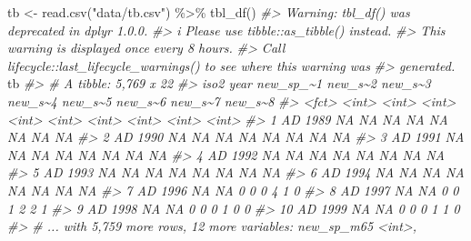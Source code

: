 \documentclass[
]{book}
\newenvironment{Shaded}{\begin{snugshade}}{\end{snugshade}}
\newcommand{\CommentTok}[1]{\textcolor[rgb]{0.56,0.35,0.01}{\textit{#1}}}
\newcommand{\FunctionTok}[1]{\textcolor[rgb]{0.00,0.00,0.00}{#1}}
\newcommand{\NormalTok}[1]{#1}
\newcommand{\OtherTok}[1]{\textcolor[rgb]{0.56,0.35,0.01}{#1}}
\newcommand{\SpecialCharTok}[1]{\textcolor[rgb]{0.00,0.00,0.00}{#1}}
\newcommand{\StringTok}[1]{\textcolor[rgb]{0.31,0.60,0.02}{#1}}
\begin{document}
\begin{Shaded}
\begin{Highlighting}[]
\NormalTok{tb }\OtherTok{\textless{}{-}} \FunctionTok{read.csv}\NormalTok{(}\StringTok{"data/tb.csv"}\NormalTok{) }\SpecialCharTok{\%\textgreater{}\%} \FunctionTok{tbl\_df}\NormalTok{()}
\CommentTok{\#\textgreater{} Warning: \textasciigrave{}tbl\_df()\textasciigrave{} was deprecated in dplyr 1.0.0.}
\CommentTok{\#\textgreater{} i Please use \textasciigrave{}tibble::as\_tibble()\textasciigrave{} instead.}
\CommentTok{\#\textgreater{} This warning is displayed once every 8 hours.}
\CommentTok{\#\textgreater{} Call \textasciigrave{}lifecycle::last\_lifecycle\_warnings()\textasciigrave{} to see where this warning was}
\CommentTok{\#\textgreater{} generated.}
\NormalTok{tb}
\CommentTok{\#\textgreater{} \# A tibble: 5,769 x 22}
\CommentTok{\#\textgreater{}    iso2   year new\_sp\_\textasciitilde{}1 new\_s\textasciitilde{}2 new\_s\textasciitilde{}3 new\_s\textasciitilde{}4 new\_s\textasciitilde{}5 new\_s\textasciitilde{}6 new\_s\textasciitilde{}7 new\_s\textasciitilde{}8}
\CommentTok{\#\textgreater{}    \textless{}fct\textgreater{} \textless{}int\textgreater{}     \textless{}int\textgreater{}   \textless{}int\textgreater{}   \textless{}int\textgreater{}   \textless{}int\textgreater{}   \textless{}int\textgreater{}   \textless{}int\textgreater{}   \textless{}int\textgreater{}   \textless{}int\textgreater{}}
\CommentTok{\#\textgreater{}  1 AD     1989        NA      NA      NA      NA      NA      NA      NA      NA}
\CommentTok{\#\textgreater{}  2 AD     1990        NA      NA      NA      NA      NA      NA      NA      NA}
\CommentTok{\#\textgreater{}  3 AD     1991        NA      NA      NA      NA      NA      NA      NA      NA}
\CommentTok{\#\textgreater{}  4 AD     1992        NA      NA      NA      NA      NA      NA      NA      NA}
\CommentTok{\#\textgreater{}  5 AD     1993        NA      NA      NA      NA      NA      NA      NA      NA}
\CommentTok{\#\textgreater{}  6 AD     1994        NA      NA      NA      NA      NA      NA      NA      NA}
\CommentTok{\#\textgreater{}  7 AD     1996        NA      NA       0       0       0       4       1       0}
\CommentTok{\#\textgreater{}  8 AD     1997        NA      NA       0       0       1       2       2       1}
\CommentTok{\#\textgreater{}  9 AD     1998        NA      NA       0       0       0       1       0       0}
\CommentTok{\#\textgreater{} 10 AD     1999        NA      NA       0       0       0       1       1       0}
\CommentTok{\#\textgreater{} \# ... with 5,759 more rows, 12 more variables: new\_sp\_m65 \textless{}int\textgreater{},}

\end{Highlighting}
\end{Shaded}
\end{document}
